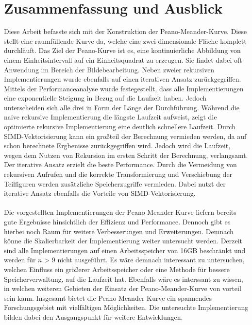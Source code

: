 \documentclass[course=erap]{aspdoc}
\begin{document}
\section{Zusammenfassung und Ausblick}
Diese Arbeit befasste sich mit der Konstruktion der Peano-Meander-Kurve. Diese stellt eine raumfüllende Kurve da, welche eine zwei-dimensionale Fläche komplett durchläuft. Das Ziel der Peano-Kurve ist es, eine kontinuierliche Abbildung von einem Einheitsintervall auf ein Einheitsquadrat zu erzeugen. Sie findet dabei oft Anwendung im Bereich der Bildebearbeitung. Neben zweier rekursiven Implementierungen wurde ebenfalls auf einen iterativen Ansatz zurückgegriffen. Mittels der Performanceanalyse wurde festegestellt, dass alle Implementierungen eine exponentielle Steigung in Bezug auf die Laufzeit haben. Jedoch unterscheiden sich alle drei in Form der Länge der Durchführung. Während die naive rekursive Implementierung die längste Laufzeit aufweist, zeigt die optimierte rekursive Implementierung eine deutlich schnellere Laufzeit. Durch SIMD-Vektorisierung kann ein großteil der Berechnung vermieden werden, da auf schon berechnete Ergbenisse zurückgegriffen wird. Jedoch wird die Laufzeit, wegen dem Nutzen von Rekursion im ersten Schritt der Berechnung, verlangsamt. Der iterative Ansatz erzielt die beste Performance. Durch die Vermeidung von rekursiven Aufrufen und die korrekte Transformierung und Verschiebung der Teilfiguren werden zusätzliche Speicherzugriffe vermieden. Dabei nutzt der iterative Ansatz ebenfalls die Vorteile von SIMD-Vektorisierung.\\
\\
Die vorgestellten Implementierungen der Peano-Meander Kurve liefern bereits gute Ergebnisse hinsichtlich der Effizienz und Performance. Dennoch gibt es hierbei noch Raum für weitere Verbesserungen und Erweiterungen. Demnach könne die Skalierbarkeit der Implementierung weiter untersucht werden. Derzeit sind alle Implementierungen auf einen Arbeitsspeicher von 16GB beschränkt und werden für \(n\) > 9 nicht ausgeführt. Es wäre demnach interessant zu untersuchen, welchen Einfluss ein größerer Arbeitsspeicher oder eine Methode für bessere Speicherverwaltung, auf die Laufzeit hat. Ebenfalls wäre es interssant zu wissen, in welchen weiteren Gebieten der Einsatz der Peano-Meander-Kurve von vorteil sein kann.
Insgesamt bietet die Peano-Meander-Kurve ein spannendes Forschungsgebiet mit vielfältigen Möglichkeiten. Die untersuchte Implementierung bilden dabei den Ausgangspunkt für weitere Entwicklungen.



{}
\end{document}
